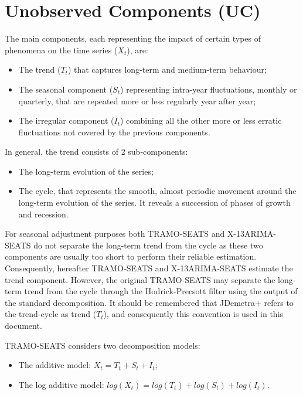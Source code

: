 \documentclass[
  letterpaper,
  DIV=11,
  numbers=noendperiod]{scrreprt}
\begin{document}
\hypertarget{unobserved-components-uc}{%
\section{Unobserved Components (UC)}\label{unobserved-components-uc}}

The main components, each representing the impact of certain types of
phenomena on the time series (\(X_{t}\)), are:

\begin{itemize}
\item
  The trend (\(T_{t}\)) that captures long-term and medium-term
  behaviour;
\item
  The seasonal component (\(S_{t}\)) representing intra-year
  fluctuations, monthly or quarterly, that are repeated more or less
  regularly year after year;
\item
  The irregular component (\(I_{t}\)) combining all the other more or
  less erratic fluctuations not covered by the previous components.
\end{itemize}

In general, the trend consists of 2 sub-components:

\begin{itemize}
\item
  The long-term evolution of the series;
\item
  The cycle, that represents the smooth, almost periodic movement around
  the long-term evolution of the series. It reveals a succession of
  phases of growth and recession.
\end{itemize}

For seasonal adjustment purposes both TRAMO-SEATS and X-13ARIMA-SEATS do
not separate the long-term trend from the cycle as these two components
are usually too short to perform their reliable estimation.
Consequently, hereafter TRAMO-SEATS and X-13ARIMA-SEATS estimate the
trend component. However, the original TRAMO-SEATS may separate the
long-term trend from the cycle through the Hodrick-Precsott filter using
the output of the standard decomposition. It should be remembered that
JDemetra+ refers to the trend-cycle as trend (\(T_{t}\)), and
consequently this convention is used in this document.

TRAMO-SEATS considers two decomposition models:

\begin{itemize}
\item
  The additive model: \(X_{t} = T_{t} + S_{t} + I_{t}\);
\item
  The log additive model:
  \(log(X_{t}) = log(T_{t}) + log(S_{t}) + log(I_{t})\).
\end{itemize}
\end{document}
